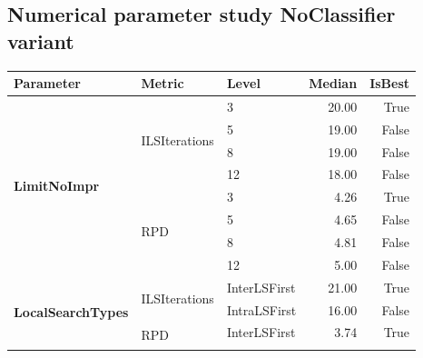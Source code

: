 \subsection{Numerical parameter study NoClassifier variant}
\begin{table}[!ht]
	\small
	\centering
	\renewcommand{\multirowsetup}{\centering}
	\renewcommand{\arraystretch}{1.15}
	\begin{tabular}{l|l|l|r|r}
		\textbf{Parameter}                          & \textbf{Metric}                & \textbf{Level}        & \textbf{Median} & \textbf{IsBest} \\
		\hline
		\multirow{8}{*}{\textbf{LimitNoImpr}}       & \multirow{4}{*}{ILSIterations} & 3                     & 20.00           & True            \\\cline{3-5}
		                                            &                                & 5                     & 19.00           & False           \\\cline{3-5}
		                                            &                                & 8                     & 19.00           & False           \\\cline{3-5}
		                                            &                                & 12                    & 18.00           & False           \\\cline{2-5}
		                                            & \multirow{4}{*}{RPD}           & 3                     & 4.26            & True            \\\cline{3-5}
		                                            &                                & 5                     & 4.65            & False           \\\cline{3-5}
		                                            &                                & 8                     & 4.81            & False           \\\cline{3-5}
		                                            &                                & 12                    & 5.00            & False           \\\hline
		\multirow{4}{*}{\textbf{LocalSearchTypes}}  & \multirow{2}{*}{ILSIterations} & InterLSFirst          & 21.00           & True            \\\cline{3-5}
		                                            &                                & IntraLSFirst          & 16.00           & False           \\\cline{2-5}
		                                            & \multirow{2}{*}{RPD}           & InterLSFirst          & 3.74            & True            \\\cline{3-5}

\end{tabular}
\end{table}
